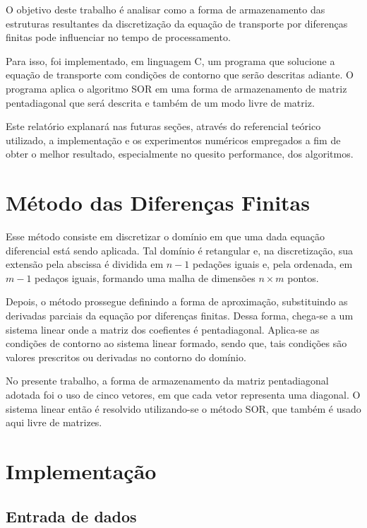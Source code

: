 \documentclass[
	article,			%
	11pt,				%
	oneside,			%
	a4paper,			%
	english,			%
	brazil,				%
	sumario=tradicional
	]{abntex2}
\begin{document}
O objetivo deste trabalho é analisar como a forma de armazenamento das estruturas resultantes da discretização
da equação de transporte por diferenças finitas pode influenciar no tempo de processamento.

Para isso, foi implementado, em linguagem C, um programa que solucione a equação de transporte com condições de
contorno que serão descritas adiante. O programa aplica o algoritmo SOR em uma forma de armazenamento de matriz
pentadiagonal que será descrita e também de um modo livre de matriz.

Este relatório explanará nas futuras seções, através do referencial teórico utilizado, a implementação e os experimentos
numéricos empregados a fim de obter o melhor resultado, especialmente no quesito performance, dos algoritmos.


\section{Método das Diferenças Finitas}

Esse método consiste em discretizar o domínio em que uma dada equação diferencial está sendo aplicada. Tal domínio é retangular e,
na discretização, sua extensão pela abscissa é dividida em $ n-1 $ pedações iguais e, pela ordenada, em $ m-1 $ pedaços iguais, formando
uma malha de dimensões $ n \times m $ pontos.

Depois, o método prossegue definindo a forma de aproximação, substituindo as derivadas parciais da equação por diferenças finitas.
Dessa forma, chega-se a um sistema linear onde a matriz dos coefientes é pentadiagonal. Aplica-se as condições de contorno ao sistema
linear formado, sendo que, tais condições são valores prescritos ou derivadas no contorno do domínio.

No presente trabalho, a forma de armazenamento da matriz pentadiagonal adotada foi o uso de cinco vetores, em que cada vetor representa
uma diagonal. O sistema linear então é resolvido utilizando-se o método SOR, que também é usado aqui livre de matrizes.

\section{Implementação}

\subsection{Entrada de dados}
\end{document}

